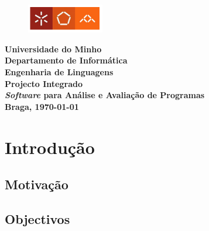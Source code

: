 \documentclass[english,a4paper]{report}
\begin{document}
\begin{titlepage}
\thispagestyle{empty}
\begin{figure}[htbp]
\begin{center}
\includegraphics[width=0.3\textwidth]{Images/DI-UM}
\end{center}
\end{figure}
{\centering \large
{\large\bf \textbf{Universidade do Minho} \\ Departamento de Informática}\\
\vspace{1cm}
\bf{Engenharia de Linguagens}\\
\vspace{2cm}
{\Large \bf {Projecto Integrado}}\\
\vspace{1cm}
{\LARGE \bf {\emph{Software} para Análise e Avaliação de Programas}}\\
\vspace{1cm}
\vspace{8.5cm}
}
\vspace {1.5cm}
\textbf{Braga, \today}\\
\pagebreak
\end{titlepage}



\tableofcontents
\listoffigures
\listoftables
\newpage


\newpage
\chapter{Introdução} \label{chap int}

\section{Motivação}

\section{Objectivos}

\end{document}

